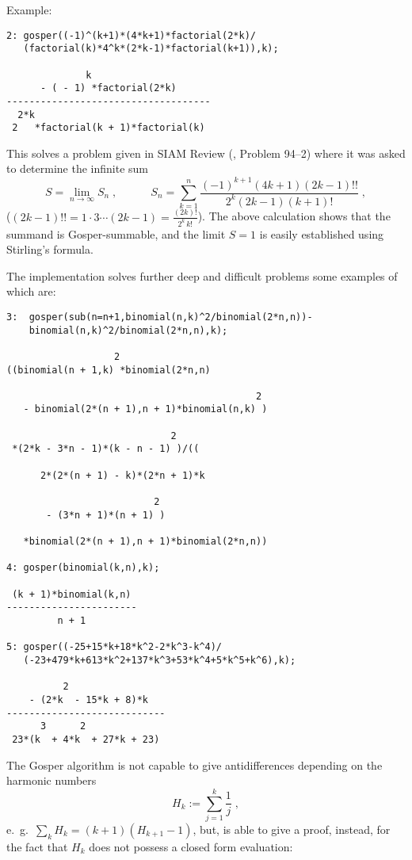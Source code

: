 Example:

{\small
\begin{verbatim}
2: gosper((-1)^(k+1)*(4*k+1)*factorial(2*k)/
   (factorial(k)*4^k*(2*k-1)*factorial(k+1)),k);

              k
      - ( - 1) *factorial(2*k)
------------------------------------
  2*k
 2   *factorial(k + 1)*factorial(k)
\end{verbatim}
}\noindent
This solves a problem given in SIAM Review (\cite{OverhauserKim:94}, Problem 94--2)
where it was asked to determine the infinite sum
\[
S=\lim_{n\rightarrow\infty} S_n
\;,
\quad\quad\quad
S_n=\sum_{k=1}^n
\frac{(-1)^{k+1}(4k+1)(2k-1)!!}{2^k(2k-1)(k+1)!}
\;,
\]
($(2k-1)!!=1\cdot 3 \cdots (2k-1)=\frac{(2k)!}{2^k\,k!}$).
The above calculation shows that the summand is Gosper-summable,
and the limit $S=1$ is easily established using Stirling's formula.

The implementation solves further deep and difficult problems some examples of
which are:%

{\small
\begin{verbatim}
3:  gosper(sub(n=n+1,binomial(n,k)^2/binomial(2*n,n))-
    binomial(n,k)^2/binomial(2*n,n),k);

                   2
((binomial(n + 1,k) *binomial(2*n,n)

                                            2
   - binomial(2*(n + 1),n + 1)*binomial(n,k) )

                             2
 *(2*k - 3*n - 1)*(k - n - 1) )/((

      2*(2*(n + 1) - k)*(2*n + 1)*k

                          2
       - (3*n + 1)*(n + 1) )

   *binomial(2*(n + 1),n + 1)*binomial(2*n,n))

4: gosper(binomial(k,n),k);

 (k + 1)*binomial(k,n)
-----------------------
         n + 1

5: gosper((-25+15*k+18*k^2-2*k^3-k^4)/
   (-23+479*k+613*k^2+137*k^3+53*k^4+5*k^5+k^6),k);

          2
    - (2*k  - 15*k + 8)*k
----------------------------
      3      2
 23*(k  + 4*k  + 27*k + 23)
\end{verbatim}
}\noindent
The Gosper algorithm is not capable to give antidifferences depending
on the harmonic numbers
\[
H_k:=\sum_{j=1}^k\frac{1}{j}
\;,
\]
e.\ g.\ $\sum_k H_k=(k+1)(H_{k+1}-1)$, but, is able to give a proof, instead,
for the fact that $H_k$ does not possess a closed form evaluation:

